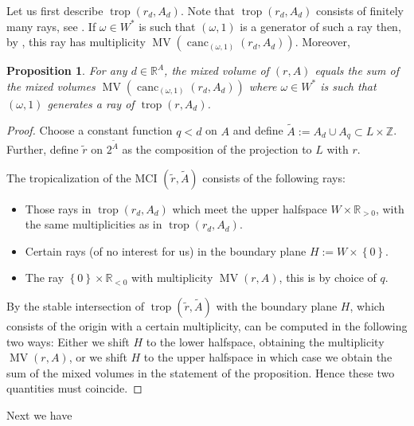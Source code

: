 \documentclass[a4paper]{article}
\newtheorem{proposition}{Proposition}
\theoremstyle{remark}
\newcommand{\set}[1]{\left\{#1\right\}}
\def\RR{\mathbb{R}}
\def\ZZ{\mathbb{Z}}
\DeclareMathOperator{\trop}{trop}
\DeclareMathOperator{\mv}{MV}
\DeclareMathOperator{\canc}{canc}
\begin{document}
Let us first describe $\trop(r_d,A_d)$. Note that $\trop(r_d,A_d)$
consists of finitely many rays, see . If $\omega\in W^{*}$ is such that
$(\omega,1)$ is a generator of such a ray then, by , this
ray has multiplicity $\mv(\canc_{(\omega,1)}(r_d,A_d))$. Moreover,
\begin{proposition}
  \label{prop:liftroots}
  For any $d \in \RR^A$, the mixed volume of $(r,A)$ equals the sum of
  the mixed volumes $\mv(\canc_{(\omega,1)}(r_d,A_d))$ where
  $\omega\in W^{*}$ is such that $(\omega,1)$ generates a ray of $\trop(r,A_d)$.
\end{proposition}
\begin{proof}
  Choose a constant function $q<d$ on $A$ and define
  $\tilde A := A_d\cup A_q\subset L\times \ZZ$. Further, define
  $\tilde r$ on $2^{\tilde A}$ as the composition of the projection to
  $L$ with $r$.

  The tropicalization of the MCI
  $(\tilde r, \tilde A)$ consists of the following rays:
  \begin{itemize}
  \item Those rays in $\trop (r_d,A_d)$ which meet the upper halfspace
    $W\times\RR_{>0}$, with the same multiplicities as in $\trop(r_d,A_d)$.
  \item Certain rays (of no interest for us) in the boundary plane $H:=W\times\set{0}$.
  \item The ray $\set{0}\times\RR_{<0}$ with multiplicity $\mv(r,A)$, this is by choice
    of $q$.
  \end{itemize}

  By \cite[Proposition
  3.6.12]{maclaganIntroductionTropicalGeometry2021} the stable
  intersection of $\trop(\tilde r, \tilde A)$ with the boundary plane
  $H$, which consists of the origin with a certain multiplicity, can
  be computed in the following two ways: Either we shift $H$ to the
  lower halfspace, obtaining the multiplicity $\mv(r,A)$, or we shift
  $H$ to the upper halfspace in which case we obtain the sum of the
  mixed volumes in the statement of the proposition. Hence these two
  quantities must coincide.
\end{proof}

Next we have
\end{document}
